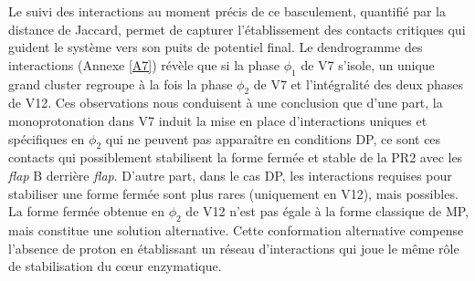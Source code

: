 \documentclass{isddmaster}
\begin{document}
	Le suivi des interactions au moment précis de ce basculement, quantifié par la distance de Jaccard, permet de capturer l'établissement des contacts critiques qui guident le système vers son puits de potentiel final.
    Le dendrogramme des interactions (Annexe \ref{A7}) révèle que si la phase $\phi_1$ de V7 s'isole, un unique grand cluster regroupe à la fois la phase $\phi_2$ de V7 et l'intégralité des deux phases de V12.
    Ces observations nous conduisent à une conclusion que d'une part, la monoprotonation dans V7 induit la mise en place d'interactions uniques et spécifiques en $\phi_2$ qui ne peuvent pas apparaître en conditions DP, ce sont ces contacts qui possiblement stabilisent la forme fermée et stable de la PR2 avec les \textit{flap} B derrière \textit{flap}.
    D'autre part, dans le cas DP, les interactions requises pour stabiliser une forme fermée sont plus rares (uniquement en V12), mais possibles. La forme fermée obtenue en $\phi_2$ de V12 n'est pas égale à la forme classique de MP, mais constitue une solution alternative.
    Cette conformation alternative compense l'absence de proton en établissant un réseau d'interactions qui joue le même rôle de stabilisation du cœur enzymatique.
\end{document}
